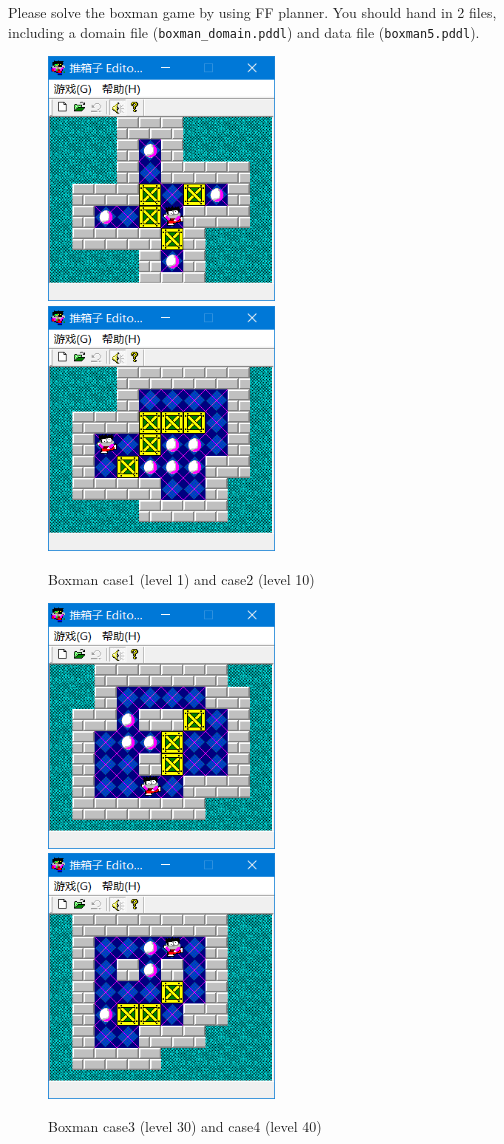 \documentclass[a4paper, 11pt]{article}
\begin{document}
Please solve the boxman game by using FF planner. You should hand in 2 files, including a domain file (\texttt{boxman\_domain.pddl}) and  data file (\texttt{boxman5.pddl}).
\begin{figure}[H]
  \centering
  \includegraphics[width=6cm]{Pic/case1}
  \qquad
  \includegraphics[width=6cm]{Pic/case2}
  \caption{Boxman case1 (level 1) and case2 (level 10)}
\end{figure}
\begin{figure}[H]
  \centering
  \includegraphics[width=6cm]{Pic/case3}
  \qquad
  \includegraphics[width=6cm]{Pic/case4}
  \caption{Boxman case3 (level 30) and case4 (level 40)}
\end{figure}
\end{document}
